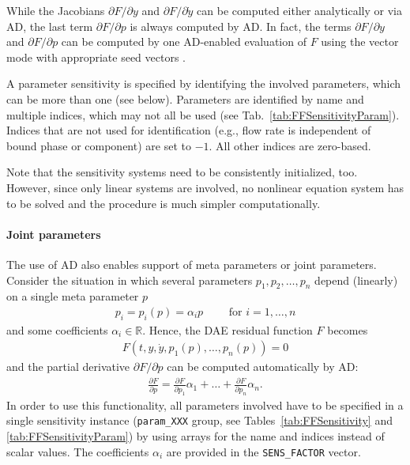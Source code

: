 While the Jacobians $\partial F / \partial y$ and $\partial F / \partial \dot{y}$ can be computed either analytically or via AD, the last term $\partial F / \partial p$ is always computed by AD.
In fact, the terms $\partial F / \partial y$ and $\partial F / \partial p$ can be computed by one AD-enabled evaluation of $F$ using the vector mode with appropriate seed vectors \cite{Puttmann2016}.

A parameter sensitivity is specified by identifying the involved parameters, which can be more than one (see below).
Parameters are identified by name and multiple indices, which may not all be used (see Tab.~\ref{tab:FFSensitivityParam}).
Indices that are not used for identification (e.g., flow rate is independent of bound phase or component) are set to $-1$.
All other indices are zero-based.

Note that the sensitivity systems need to be consistently initialized, too.
However, since only linear systems are involved, no nonlinear equation system has to be solved and the procedure is much simpler computationally.

\paragraph{Joint parameters}
\label{par:SimParamSensJointParams}

The use of AD also enables support of meta parameters or joint parameters. 
Consider the situation in which several parameters $p_1, p_2, \dots, p_n$ depend (linearly) on a single meta parameter $p$
\begin{align*}
	p_i = p_i(p) = \alpha_i p \qquad \text{ for } i = 1, \dots, n
\end{align*}
and some coefficients $\alpha_i \in \mathds{R}$.
Hence, the DAE residual function $F$ becomes
\begin{align*}
	F(t, y, \dot{y}, p_1(p), \dots, p_n(p)) = 0
\end{align*}
and the partial derivative $\partial F / \partial p$ can be computed automatically by AD:
\begin{align*}
	\frac{\partial F}{\partial p} = \frac{\partial F}{\partial p_1} \alpha_1 + \dots + \frac{\partial F}{\partial p_n} \alpha_n.
\end{align*}
In order to use this functionality, all parameters involved have to be specified in a single sensitivity instance (\texttt{param\_XXX} group, see Tables~\ref{tab:FFSensitivity} and \ref{tab:FFSensitivityParam}) by using arrays for the name and indices instead of scalar values.
The coefficients $\alpha_i$ are provided in the \texttt{SENS\_FACTOR} vector.

